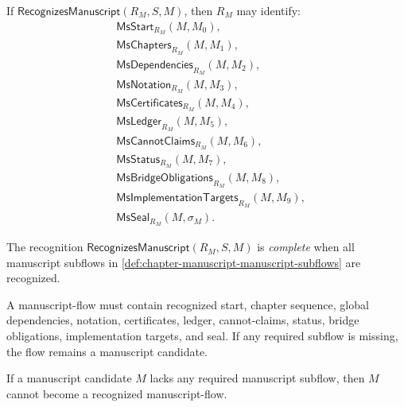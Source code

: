 \begin{definition}
\label{def:chapter-manuscript-manuscript-subflows}
If $\mathsf{RecognizesManuscript}(R_M,S,M)$, then $R_M$ may identify:
$$
\begin{aligned}
  &\mathsf{MsStart}_{R_M}(M,M_0),\\
  &\mathsf{MsChapters}_{R_M}(M,M_1),\\
  &\mathsf{MsDependencies}_{R_M}(M,M_2),\\
  &\mathsf{MsNotation}_{R_M}(M,M_3),\\
  &\mathsf{MsCertificates}_{R_M}(M,M_4),\\
  &\mathsf{MsLedger}_{R_M}(M,M_5),\\
  &\mathsf{MsCannotClaims}_{R_M}(M,M_6),\\
  &\mathsf{MsStatus}_{R_M}(M,M_7),\\
  &\mathsf{MsBridgeObligations}_{R_M}(M,M_8),\\
  &\mathsf{MsImplementationTargets}_{R_M}(M,M_9),\\
  &\mathsf{MsSeal}_{R_M}(M,\sigma_M).
\end{aligned}
$$
\end{definition}

\begin{definition}
\label{def:chapter-manuscript-complete-manuscript-recognition}
The recognition $\mathsf{RecognizesManuscript}(R_M,S,M)$ is \emph{complete} when all manuscript subflows in \autoref{def:chapter-manuscript-manuscript-subflows} are recognized.
\end{definition}

\begin{principle}
\label{prin:chapter-manuscript-no-incomplete-manuscript}
A manuscript-flow must contain recognized start, chapter sequence, global dependencies, notation, certificates, ledger, cannot-claims, status, bridge obligations, implementation targets, and seal. If any required subflow is missing, the flow remains a manuscript candidate.
\end{principle}

\begin{theorem}
\label{thm:chapter-manuscript-incomplete-manuscript-not-flow}
If a manuscript candidate $M$ lacks any required manuscript subflow, then $M$ cannot become a recognized manuscript-flow.
\end{theorem}

